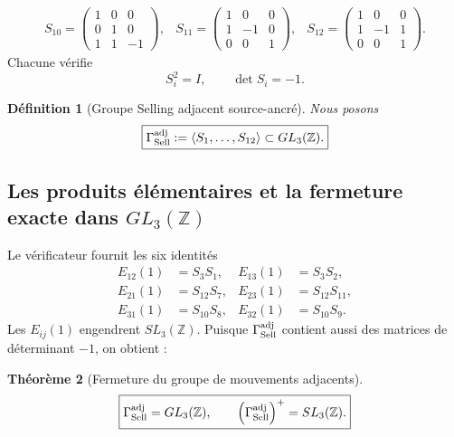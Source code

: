 \documentclass[11pt,a4paper]{article}
\newtheorem{theorem}{Théorème}[section]
\newtheorem{definition}[theorem]{Définition}
\begin{document}
\[\begin{array}{lll}
S_{10}=\begin{pmatrix}1&0&0\\0&1&0\\1&1&-1\end{pmatrix},&
S_{11}=\begin{pmatrix}1&0&0\\1&-1&0\\0&0&1\end{pmatrix},&
S_{12}=\begin{pmatrix}1&0&0\\1&-1&1\\0&0&1\end{pmatrix}.
\end{array}
\]
Chacune vérifie
\[
 S_i^2=I,
 \qquad
 \det S_i=-1.
\]

\begin{definition}[Groupe Selling adjacent source-ancré]\label{def:v24-Gamma-adj}
Nous posons
\begin{equation}\label{eq:v24-Gamma-adj}
 \boxed{
 \Gamma_{\rm Sell}^{\rm adj}
 :=
 \langle S_1,\ldots,S_{12}\rangle
 \subset GL_3(\mathbb Z).}
\end{equation}
\end{definition}

\subsection{Les produits élémentaires et la fermeture exacte dans \texorpdfstring{$GL_3(\mathbb Z)$}{GL3Z}}

Le vérificateur fournit les six identités
\begin{equation}\label{eq:v24-elementary-witnesses}
\boxed{
\begin{aligned}
 E_{12}(1)&=S_3S_1,&
 E_{13}(1)&=S_3S_2,\\
 E_{21}(1)&=S_{12}S_7,&
 E_{23}(1)&=S_{12}S_{11},\\
 E_{31}(1)&=S_{10}S_8,&
 E_{32}(1)&=S_{10}S_9.
\end{aligned}}
\end{equation}
Les $E_{ij}(1)$ engendrent $SL_3(\mathbb Z)$. Puisque $\Gamma_{\rm Sell}^{\rm adj}$ contient aussi des matrices de déterminant $-1$, on obtient :

\begin{theorem}[Fermeture du groupe de mouvements adjacents]\label{thm:v24-Gamma-GL3}
\begin{equation}\label{eq:v24-Gamma-GL3}
 \boxed{
 \Gamma_{\rm Sell}^{\rm adj}=GL_3(\mathbb Z),
 \qquad
 \left(\Gamma_{\rm Sell}^{\rm adj}\right)^+=SL_3(\mathbb Z).}
\end{equation}
\end{theorem}
\end{document}
